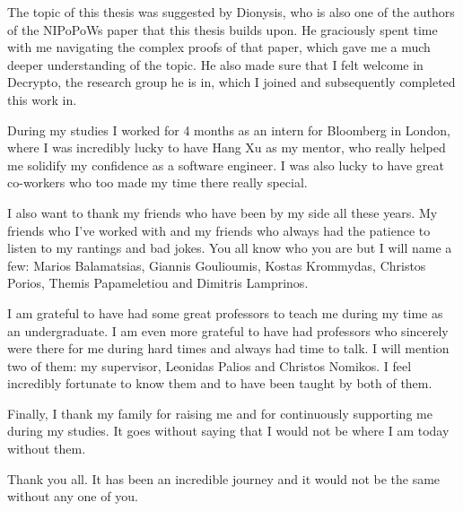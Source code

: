\documentclass{report}
\begin{document}
The topic of this thesis was suggested by Dionysis, who is also one of the authors of the NIPoPoWs paper that this thesis builds upon. He graciously spent time with me navigating the complex proofs of that paper, which gave me a much deeper understanding of the topic. He also made sure that I felt welcome in Decrypto, the research group he is in, which I joined and subsequently completed this work in.

During my studies I worked for 4 months as an intern for Bloomberg in London, where I was incredibly lucky to have Hang Xu as my mentor, who really helped me solidify my confidence as a software engineer. I was also lucky to have great co-workers who too made my time there really special.

I also want to thank my friends who have been by my side all these years. My friends who I've worked with and my friends who always had the patience to listen to my rantings and bad jokes. You all know who you are but I will name a few: Marios Balamatsias, Giannis Goulioumis, Kostas Krommydas, Christos Porios, Themis Papameletiou and Dimitris Lamprinos.

I am grateful to have had some great professors to teach me during my time as an undergraduate. I am even more grateful to have had professors who sincerely were there for me during hard times and always had time to talk. I will mention two of them: my supervisor, Leonidas Palios and Christos Nomikos. I feel incredibly fortunate to know them and to have been taught by both of them.

Finally, I thank my family for raising me and for continuously supporting me during my studies. It goes without saying that I would not be where I am today without them.

Thank you all. It has been an incredible journey and it would not be the same without any one of you.

\thispagestyle{empty}
\newpage

\tableofcontents
\thispagestyle{empty}
\newpage
\setcounter{page}{1}








\end{document}

